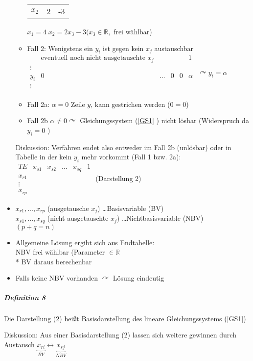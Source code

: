 \documentclass[a4paper]{scrartcl}
\begin{document}
\begin{itemize}
\begin{itemize}
\begin{tabular}{c|cc}
$x_2$ & 2 & -3 \\
\end{tabular} $x_1 = 4 \; x_2 = 2 x_3 -3 (x_3 \in \mathbb{R},$ frei wählbar)
\item Fall 2: Wenigstens ein $y_i$ ist gegen kein $x_j$ austauschbar\\
$\begin{array}{c|ccccc}
 & \text{eventuell noch nicht ausgetauschte } x_j & & & & 1\\ \hline 
\vdots \\
y_i & 0 & \dots & 0 & 0 & \alpha \\
\vdots \\
\end{array}$
$\curvearrowright y_i = \alpha $
\item Fall 2a: $\alpha = 0$ Zeile $y$, kann gestrichen werden ($0=0$)
\item Fall 2b $\alpha \neq 0 \curvearrowright$ Gleichungssystem (\ref{GS1} ) nicht lösbar (Widerspruch da $y_i = 0$ )
\end{itemize}
Diskussion: Verfahren endet also entweder im Fall 2b (unlösbar) oder in Tabelle in der kein $y_i$ mehr vorkommt (Fall 1 bzw. 2a):\\
$\begin{array}{c|ccccc} 
TE & x_{s1} & x_{s2} & \dots & x_{sq} & 1 \\ \hline
x_{r1} \\
\vdots \\
x_{rp} 
\end{array}$ (Darstellung 2)

\item $x_{r1}, ..., x_{rp}$ (ausgetausche $x_j$) \dots Basisvariable (BV)\\
$x_{s1}, ... , x_{sq}$ (nicht ausgetauschte $x_j$) \dots Nichtbasisvariable (NBV)\\
$(p + q = n )$
\item Allgemeine Lösung ergibt sich aus Endtabelle:\\
NBV frei wählbar (Parameter $\in \mathbb{R}$\\*
BV daraus berechenbar
\item Falls keine NBV vorhanden $\curvearrowright$ Lösung eindeutig
\end{itemize}
\subparagraph{Definition 8} Die Darstellung (2) heißt Basisdarstellung des lineare Gleichungssystems (\ref{GS1})

Diskussion: Aus einer Basisdarstellung (2) lassen sich weitere gewinnen durch Austausch $\underbrace{x_{ri}}_{BV} \leftrightarrow \underbrace{x_{sj}}_{NBV}$
\end{document}
